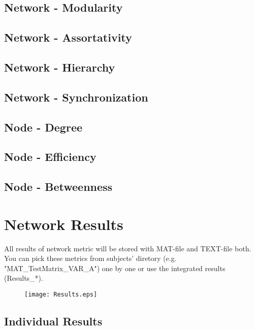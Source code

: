 \documentclass[11pt]{article}
\begin{document}
		\subsection{Network - Modularity}
		\subsection{Network - Assortativity}
		\subsection{Network - Hierarchy}
		\subsection{Network - Synchronization}
		\subsection{Node - Degree}
		\subsection{Node - Efficiency}
		\subsection{Node - Betweenness}
	\section{Network Results}
		All results of network metric will be stored with MAT-file and TEXT-file both. 
		You can pick these metrics from subjects' diretory (e.g. "MAT\_TestMatrix\_VAR\_A") one by one or use the integrated results (Results\_*).
		\begin{figure}
			\begin{center}
				\texttt{[image: Results.eps]}
			\end{center}
		\end{figure}
		\subsection{Individual Results}
\end{document}
